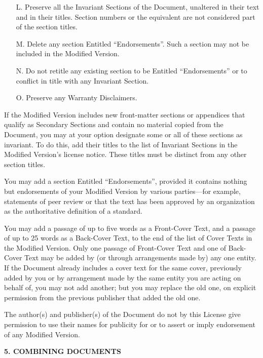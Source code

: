 \begin{scriptsize}
\begin{multicols}{2}
\begin{itemize}
    \item[L.]
      Preserve all the Invariant Sections of the Document, unaltered in their text and in their titles.  Section numbers or the equivalent are not considered part of the section titles.
   
    \item[M.]
      Delete any section Entitled ``Endorsements''.  Such a section may not be included in the Modified Version.
   
    \item[N.]
      Do not retitle any existing section to be Entitled ``Endorsements'' or to conflict in title with any Invariant Section.
   
    \item[O.]
      Preserve any Warranty Disclaimers.
    \end{itemize}

    If the Modified Version includes new front-matter sections or appendices that qualify as Secondary Sections and contain no material copied from the Document, you may at your option designate some or all of these sections as invariant.  To do this, add their titles to the list of Invariant Sections in the Modified Version's license notice. These titles must be distinct from any other section titles.

    You may add a section Entitled ``Endorsements'', provided it contains nothing but endorsements of your Modified Version by various parties---for example, statements of peer review or that the text has been approved by an organization as the authoritative definition of a standard.

    You may add a passage of up to five words as a Front-Cover Text, and a passage of up to 25 words as a Back-Cover Text, to the end of the list of Cover Texts in the Modified Version.  Only one passage of Front-Cover Text and one of Back-Cover Text may be added by (or through arrangements made by) any one entity.  If the Document already includes a cover text for the same cover, previously added by you or by arrangement made by the same entity you are acting on behalf of, you may not add another; but you may replace the old one, on explicit permission from the previous publisher that added the old one.

    The author(s) and publisher(s) of the Document do not by this License give permission to use their names for publicity for or to assert or imply endorsement of any Modified Version.

    \begin{center}
      {\bf 5. COMBINING DOCUMENTS\par}
    \end{center}



\end{multicols}
\end{scriptsize}
